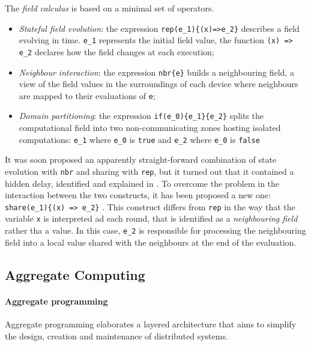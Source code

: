 The \emph{field calculus} is based on a minimal set of operators.
\begin{itemize}
    \item \emph{Stateful field evolution}: the expression \lstinline|rep(e_1){(x)=>e_2}| describes a field evolving in time.
        \lstinline{e_1} represents the initial field value, the function \lstinline|(x) => e_2| declares how the field changes
        at each execution;
    \item \emph{Neighbour interaction}: the expression \lstinline|nbr{e}| builds a neighbouring field, a view of the field
        values in the surroundings of each device where neighbours are mapped to their evaluations of \texttt{e};
    \item \emph{Domain partitioning}: the expression \lstinline|if(e_0){e_1}{e_2}| splits the computational field into
        two non-communicating zones hosting isolated computations: \lstinline|e_1| where \lstinline|e_0| is \texttt{true} and
        \lstinline{e_2} where \lstinline{e_0} is \texttt{false} %
\end{itemize}

It was soon proposed an apparently straight-forward combination of state evolution with \texttt{nbr} and sharing with \texttt{rep},
but it turned out that it contained a hidden delay, identified and explained in \cite{fieldc}.
To overcome the problem in the interaction between the two constructs, it has been proposed a new one:
\lstinline|share(e_1){(x) => e_2}| \cite{share}. %
This construct differs from \texttt{rep} in the way that the variable \texttt{x} is interpreted ad each round, that is
identified as a \emph{neighbouring field} rather tha a value.
In this case, \lstinline|e_2| is responsible for processing the neighbouring field into a local value shared with the
neighbours at the end of the evaluation.

\subsection{Aggregate Computing}
\label{subsec:aggregate-computing}

\paragraph{Aggregate programming}
Aggregate programming elaborates a layered architecture that aims to simplify the design, creation and maintenance of
distributed systems.

